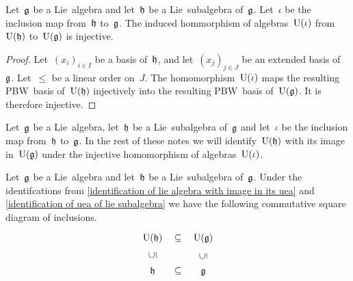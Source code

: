 

\begin{proposition}
  \label{inclusion of universal enveloping algebras}
  Let~$\mathfrak{g}$ be a Lie~algebra and let~$\mathfrak{h}$ be a Lie~subalgebra of~$\mathfrak{g}$.
  Let~$\iota$ be the inclusion map from~$\mathfrak{h}$ to~$\mathfrak{g}$.
  The induced hommorphism of algebras~$\operatorname{U}(\iota)$ from~$\operatorname{U}(\mathfrak{h})$ to~$\operatorname{U}(\mathfrak{g})$ is injective.
\end{proposition}


\begin{proof}
  Let~$(x_i)_{i \in I}$ be a basis of~$\mathfrak{h}$, and let~$(x_j)_{j \in J}$ be an extended basis of~$\mathfrak{g}$.
  Let~$\leq$ be a linear order on~$J$.
  The homomorphism~$\operatorname{U}(\iota)$ maps the resulting PBW~basis of~$\operatorname{U}(\mathfrak{h})$ injectively into the resulting PBW~basis of~$\operatorname{U}(\mathfrak{g})$.
  It is therefore injective.
\end{proof}


\begin{convention}
  \label{identification of uea of lie subalgebra}
  Let~$\mathfrak{g}$ be a Lie~algebra, let~$\mathfrak{h}$ be a Lie~subalgebra of~$\mathfrak{g}$ and let~$\iota$ be the inclusion map from~$\mathfrak{h}$ to~$\mathfrak{g}$.
  In the rest of these notes we will identify~$\operatorname{U}(\mathfrak{h})$ with its image in~$\operatorname{U}(\mathfrak{g})$ under the injective homomorphism of algebras~$\operatorname{U}(\iota)$.
\end{convention}


\begin{remark}
  Let~$\mathfrak{g}$ be a Lie~algebra and let~$\mathfrak{h}$ be a Lie~subalgebra of~$\mathfrak{g}$.
  Under the identifcations from \cref{identification of lie algebra with image in its uea} and \cref{identification of uea of lie subalgebra} we have the following commutative square diagram of inclusions.
  \[
    \begin{tikzcd}
      \Univ(\hlie)
      \arrow[phantom]{r}{\subseteq}
      &
      \Univ(\glie)
      \\
      \hlie
      \arrow[phantom]{u}[rotate=90]{\subseteq}
      \arrow[phantom]{r}{\subseteq}
      &
      \glie
      \arrow[phantom]{u}[rotate=90]{\subseteq}
    \end{tikzcd}
  \]
\end{remark}



